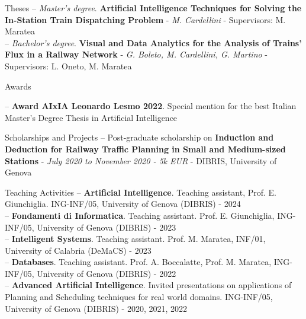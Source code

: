 \documentclass{resume} %
\begin{document}
\begin{rSection}{Theses}
-- \textit{Master's degree}. \textbf{Artificial Intelligence Techniques for Solving the In-Station
Train Dispatching Problem} - \textit{M. Cardellini} - Supervisors: M. Maratea\\
-- \textit{Bachelor's degree}. \textbf{Visual and Data Analytics for the Analysis of Trains' Flux in a Railway Network} - \textit{G. Boleto, M. Cardellini, G. Martino} - Supervisors: L. Oneto, M. Maratea
\end{rSection}
\begin{rSection}{Awards}

-- \textbf{Award AIxIA Leonardo Lesmo 2022}. Special mention for the best Italian Master's Degree Thesis in Artificial Intelligence
\end{rSection}

\begin{rSection}{Scholarships and Projects}
-- Post-graduate scholarship on \textbf{Induction and Deduction for Railway Traffic Planning in Small and Medium-sized Stations} - \textit{July 2020 to November 2020 - 5k EUR} - DIBRIS, University of Genova
\end{rSection}

\begin{rSection}{Teaching Activities}
-- \textbf{Artificial Intelligence}. Teaching assistant, Prof. E. Giunchiglia. ING-INF/05, University of Genova (DIBRIS) - 2024\\
-- \textbf{Fondamenti di Informatica}. Teaching assistant. Prof. E. Giunchiglia, ING-INF/05, University of Genova (DIBRIS) - 2023\\
-- \textbf{Intelligent Systems}. Teaching assistant. Prof. M. Maratea, INF/01, University of Calabria (DeMaCS) - 2023\\
-- \textbf{Databases}. Teaching assistant. Prof. A. Boccalatte, Prof. M. Maratea, ING-INF/05, University of Genova (DIBRIS) - 2022\\
-- \textbf{Advanced Artificial Intelligence}. Invited presentations on applications of Planning and Scheduling techniques for real world domains. ING-INF/05, University of Genova (DIBRIS) - 2020, 2021, 2022
\end{rSection}
\end{document}
